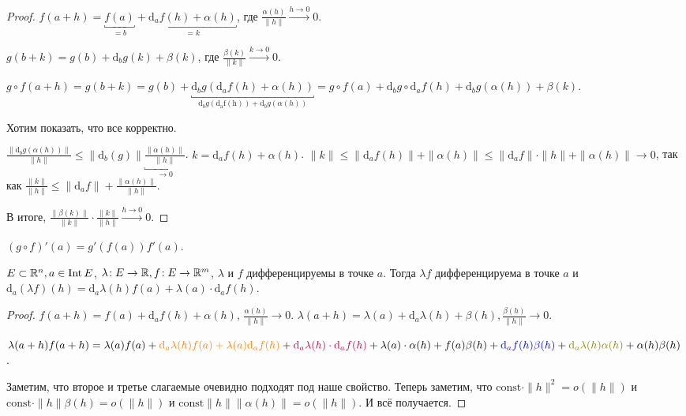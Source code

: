 \begin{proof}
    $f(a+h) = \underbracket{f(a)}_{=b} + \underbracket{\mathrm{d}_af(h) + \alpha(h)}_{=k}$, где  $\frac{\alpha(h)}{\|h\|} \xrightarrow{h \to 0} 0$.

    $g(b+k) = g(b) + \mathrm{d}_bg(k) + \beta(k)$, где  $\frac{\beta(k)}{\|k\|} \xrightarrow{k \to 0} 0$.

    $g \circ f(a + h) = g(b + k) = g(b) + \underbracket{\mathrm{d}_bg(\mathrm{d}_af(h)+\alpha(h))}_{\mathrm{d}_bg(\mathrm{d_af(h)}) + \mathrm{d}_bg(\alpha(h))} = g \circ f(a) + \mathrm{d}_bg \circ \mathrm{d}_af(h) + \mathrm{d}_bg(\alpha(h)) + \beta(k)$.

    Хотим показать, что все корректно.

    $\frac{\|\mathrm{d}_bg(\alpha(h))\|}{\|h\|} \le \|\mathrm{d}_b(g)\| \underbracket{\frac{\|\alpha(h)\|}{\|h\|}}_{\to 0}$. $k = \mathrm{d}_af(h) + \alpha(h)$.  $\|k\| \le \|\mathrm{d}_af(h)\| + \|\alpha(h)\| \le \|\mathrm{d}_af\| \cdot \|h\| + \|\alpha(h)\| \to 0$, так как $\frac{\|k\|}{\|h\|} \le \|\mathrm{d}_af\| + \frac{\|\alpha(h)\|}{\|h\|}$.

    В итоге, $\frac{\|\beta(k)\|}{\|k\|} \cdot \frac{\|k\|}{\|h\|} \xrightarrow{h \to 0} 0$.
\end{proof}
\begin{consequence}
    $(g \circ f)'(a) = g'(f(a)) f'(a)$.
\end{consequence}
\begin{theorem}
    $E \subset \mathbb{R}^n, a \in \operatorname{Int} E$,  $\lambda\!: E \to \mathbb{R}, f\!: E \to \mathbb{R}^m$,  $\lambda$ и  $f$ дифференцируемы в точке  $a$. Тогда  $\lambda f$ дифференцируема в точке  $a$ и  $\mathrm{d}_a(\lambda f)(h) = \mathrm{d}_a \lambda(h) f(a) + \lambda(a) \cdot \mathrm{d}_af(h)$.
\end{theorem}
\begin{proof}
    $f(a+h) = f(a) + \mathrm{d}_af(h) + \alpha(h)$,  $\frac{\alpha(h)}{\|h\|} \to 0$. $\lambda(a + h) = \lambda(a) + \mathrm{d}_a\lambda(h) + \beta(h), \frac{\beta(h)}{\|h\|} \to 0$.

    $\lambda(a+h)f(a+h) = \lambda(a)f(a) + {\color{orange}\mathrm{d}_a\lambda(h)f(a) + \lambda(a)\mathrm{d}_af(h)} + {\color{purple}\mathrm{d}_a\lambda(h)\cdot \mathrm{d}_af(h)} + \lambda(a) \cdot \alpha(h) + f(a) \beta(h) + {\color{blue}\mathrm{d}_af(h)\beta(h)} + {\color{olive}\mathrm{d}_a\lambda(h)\alpha(h)} +\alpha(h)\beta(h)$. 

    Заметим, что {\color{orange}второе и третье} слагаемые очевидно подходят под наше свойство. Теперь заметим, что  {\color{purple}$\text{const} \cdot \|h\|^2 = o(\|h\|)$} и  {\color{blue}$\text{const} \cdot \|h\| \beta(h) = o(\|h\|)$} и  {\color{olive}$\text{const} \|h\| \|\alpha(h)\| = o(\|h\|)$}. И всё получается. 
\end{proof}
